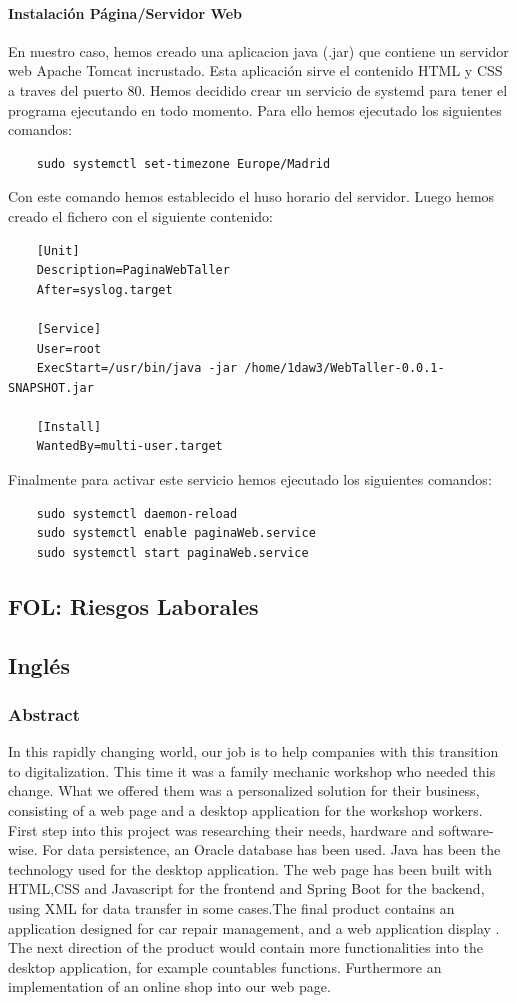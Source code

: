 \documentclass{article}
\begin{document}
{  \paragraph{Instalación Página/Servidor Web}
  En nuestro caso, hemos creado una aplicacion java (.jar) que contiene un servidor web Apache Tomcat incrustado. Esta 
  aplicación sirve el contenido HTML y CSS a traves del puerto 80. Hemos decidido crear un servicio de systemd para tener 
  el programa ejecutando en todo momento. Para ello hemos ejecutado los siguientes comandos: 
  \begin{lstlisting}
    sudo systemctl set-timezone Europe/Madrid
  \end{lstlisting}
  Con este comando hemos establecido el huso horario del servidor.
  Luego hemos creado el fichero  con el siguiente contenido: 
  \begin{lstlisting}
    [Unit]
    Description=PaginaWebTaller
    After=syslog.target

    [Service]
    User=root
    ExecStart=/usr/bin/java -jar /home/1daw3/WebTaller-0.0.1-SNAPSHOT.jar

    [Install]
    WantedBy=multi-user.target  
  \end{lstlisting}
  Finalmente para activar este servicio hemos ejecutado los siguientes comandos:
  \begin{lstlisting}
    sudo systemctl daemon-reload
    sudo systemctl enable paginaWeb.service
    sudo systemctl start paginaWeb.service
  \end{lstlisting}
}
\subsection{FOL: Riesgos Laborales}

\subsection{Inglés}
\subsubsection{Abstract}
In this rapidly changing world, our job is to help companies with this transition to digitalization. This time it was a family mechanic workshop who needed this change. What we offered them was a personalized solution for their business, consisting of a web page and a desktop application for the workshop workers. First step into this project was researching their needs, hardware and software-wise. For data persistence, an Oracle database has been used. Java has been the technology used for the desktop application.
The web page has been built with HTML,CSS and Javascript for the frontend and Spring Boot for the backend, using XML for data transfer in some cases.The final product contains an application designed for car repair management, and a web application display .
The next direction of the product would contain more functionalities into the desktop application, for example countables functions. Furthermore an implementation of an online shop into our web page.
\end{document}
